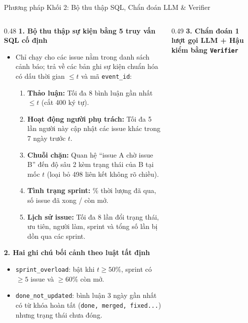 \begin{frame}{Phương pháp Khối 2: Bộ thu thập SQL, Chẩn đoán LLM \& Verifier}
  \scriptsize
  \begin{columns}[T,onlytextwidth]
    \begin{column}{0.48\textwidth}
      \textbf{1. Bộ thu thập sự kiện bằng 5 truy vấn SQL cố định}
      \begin{itemize}
        \setlength{\itemsep}{1pt}
        \item Chỉ chạy cho các issue nằm trong danh sách cảnh báo; trả về các bản ghi sự kiện chuẩn hóa có dấu thời gian $\le t$ và mã \texttt{event\_id}:
        \begin{enumerate}
          \scriptsize
          \setlength{\itemsep}{0.8pt}
          \item \textbf{Thảo luận:} Tối đa 8 bình luận gần nhất $\le t$ (cắt 400 ký tự).
          \item \textbf{Hoạt động người phụ trách:} Tối đa 5 lần người này cập nhật các issue khác trong 7 ngày trước $t$.
          \item \textbf{Chuỗi chặn:} Quan hệ ``issue A chờ issue B'' đến độ sâu 2 kèm trạng thái của B tại mốc $t$ (loại bỏ 498 liên kết không rõ chiều).
          \item \textbf{Tình trạng sprint:} \% thời lượng đã qua, số issue đã xong / còn mở.
          \item \textbf{Lịch sử issue:} Tối đa 8 lần đổi trạng thái, ưu tiên, người làm, sprint và tổng số lần bị dồn qua các sprint.
        \end{enumerate}
      \end{itemize}
      \vspace{0.03cm}
      \textbf{2. Hai ghi chú bối cảnh theo luật tất định}
      \begin{itemize}
        \setlength{\itemsep}{1pt}
        \item \texttt{sprint\_overload}: bật khi $t \ge 50\%$, sprint có $\ge 5$ issue và $\ge 60\%$ còn mở.
        \item \texttt{done\_not\_updated}: bình luận 3 ngày gần nhất có từ khóa hoàn tất (\texttt{done, merged, fixed...}) nhưng trạng thái chưa đóng.
      \end{itemize}
    \end{column}
    \begin{column}{0.49\textwidth}
      \textbf{3. Chẩn đoán 1 lượt gọi LLM + Hậu kiểm bằng \texttt{Verifier}}
      \begin{itemize}
        \setlength{\itemsep}{1pt}

\end{itemize}
\end{column}
\end{columns}
\end{frame}

